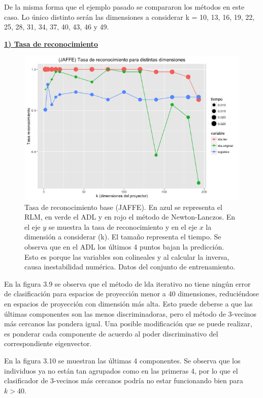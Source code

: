 De la misma forma que el ejemplo pasado se compararon los métodos en este caso. Lo único distinto serán las dimensiones a considerar k = 10, 13, 16, 19, 22, 25, 28, 31, 34, 37, 40, 43, 46 y 49. 

\underline{\textbf{1) Tasa de reconocimiento}}

\begin{figure}[!ht]
  \centering
  \includegraphics[width=1\textwidth]{Figures/Chapter4_Comparacion_Jaf.png} 
  \caption[Tasa de reconocimiento base (JAFFE)]
  {Tasa de reconocimiento base (JAFFE). En azul se representa el RLM, en verde el ADL y en rojo el método de Newton-Lanczos. En el eje $y$ se muestra la tasa de reconocimiento y en el eje $x$ la dimensión a considerar (k). El tamaño representa el tiempo. Se observa que en el ADL los últimos 4 puntos bajan la predicción. Esto es porque las variables son colineales y al calcular la inversa, causa inestabilidad numérica. Datos del conjunto de entrenamiento.}
\end{figure}

En la figura 3.9 se observa que el método de lda iterativo no tiene ningún error de clasificación para espacios de proyección menor a 40 dimensiones, reduciéndose en espacios de proyección con dimensión más alta. Esto puede deberse a que las últimas componentes son las menos discriminadoras, pero el método de 3-vecinos más cercanos las pondera igual. Una posible modificación que se puede realizar, es ponderar cada componente de acuerdo al poder discriminativo del correspondiente eigenvector.

En la figura 3.10 se muestran las últimas 4 componentes. Se observa que los individuos ya no están tan agrupados como en las primeras 4, por lo que el clasificador de 3-vecinos más cercanos podría no estar funcionando bien para $k > 40$.

